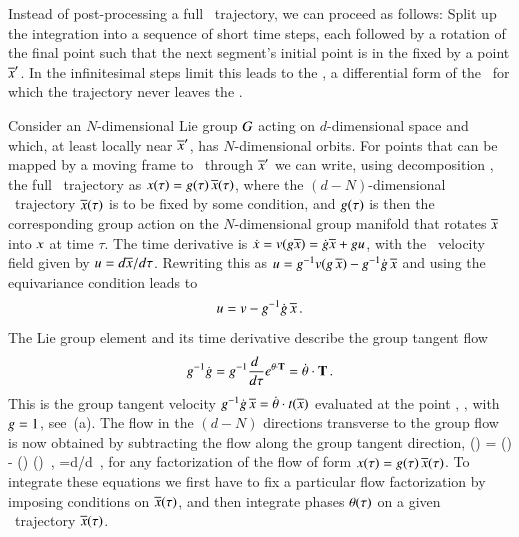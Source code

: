 \documentclass[final,number,sort&compress]{elsarticle}
\begin{document}
Instead of post-processing a full \statesp\ trajectory, we
can proceed as follows: Split up the integration into a
sequence of short time steps, each followed by a rotation of
the final point such that the next segment's initial point is
in the {\em \slice} fixed by a point ${\overline{x}'} $.
In the infinitesimal steps limit
this leads to the \emph{\mslices}, a differential form of the
\mframes\ for which the trajectory never leaves the
\reducedsp.

Consider an $N$-dimensional Lie group $G$ acting on
$d$-dimensional space and which, at least locally near
${\overline{x}'}$, has $N$-dimensional orbits. For points that can be
mapped by a moving frame to \slice\ through ${\overline{x}'}$ we can
write, using decomposition , the full
\statesp\ trajectory as $x(\tau)=
g(\tau)\,\overline{x}(\tau)$, where the
$(d\!-\!N)$-dim\-ens\-ion\-al \reducedsp\ trajectory
$\overline{x}(\tau)$ is to be fixed by some condition, and
$g(\tau)$ is then the corresponding group action on the
$N$-dim\-ens\-ion\-al group manifold that
rotates $\overline{x}$ into $x$ at time $\tau$. The time
derivative is $\dot{x}= v(g\overline{x}) =
\dot{g}\overline{x} + gu$, with the \reducedsp\
velocity field given by $u={d\overline{x}}/{d\tau}$. Rewriting
this as $ u = g^{-1} v(g \, \overline{x}) -
g^{-1} \dot{g} \, \overline{x} $ and using the
equivariance condition  leads to
\[
u = v - g^{-1} \dot{g} \, \overline{x}
\,.
\]
The Lie group element  and its time
derivative describe the group tangent flow
\[
g^{-1} \dot{g} =
g^{-1}\frac{d~}{d\tau} e^{{\bf \theta} \cdot \mathbf{T} } =
\dot{{\bf \theta}} \cdot \mathbf{T}
\,.
\]
This is the group tangent velocity $g^{-1} \dot{g}
\, \overline{x} = \dot{{\bf \theta}} \cdot t(\overline{x})$
evaluated at the point \sspRed, \ie, with ${g} = 1$,
see \,(a).
 The flow in the $(d\!-\!N)$
directions transverse to the group flow is now obtained by
subtracting the flow along the group tangent direction,
\beq
\velRed(\sspRed) = \vel(\sspRed)
      - \dot{\gSpace}(\sspRed) \cdot \groupTan(\sspRed)
\,,\qquad
\velRed={d\sspRed}/{d\tau}
\,,
for any factorization of the flow of form $x(\tau)=
g(\tau)\, \overline{x}(\tau)$. To integrate these equations
we first have to fix a particular flow factorization by
imposing conditions on $\overline{x}(\tau)$, and then integrate
phases ${\bf \theta}(\tau)$ on a given \reducedsp\ trajectory
$\overline{x}(\tau)$.
\end{document}
